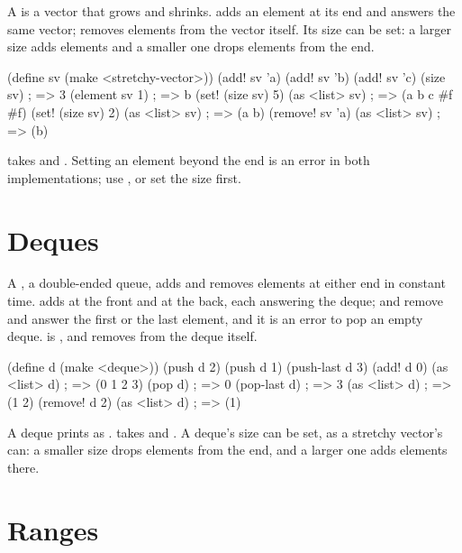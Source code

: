 A  is a vector that grows and shrinks.
 adds an element at its end and answers the same vector;
 removes elements from the vector itself. Its size can be
set: a larger size adds  elements and a smaller one drops
elements from the end.

\begin{dylan}
(define sv (make <stretchy-vector>))
(add! sv 'a)
(add! sv 'b)
(add! sv 'c)
(size sv)           ; => 3
(element sv 1)      ; => b
(set! (size sv) 5)
(as <list> sv)      ; => (a b c #f #f)
(set! (size sv) 2)
(as <list> sv)      ; => (a b)
(remove! sv 'a)
(as <list> sv)      ; => (b)
\end{dylan}

\noindent {} takes  and . Setting an
element beyond the end is an error in both implementations; use
, or set the size first.

\section{Deques}\label{sec:collections-deques}

A , a double-ended queue, adds and removes elements at
either end in constant time.  adds at the front and
 at the back, each answering the deque;  and
 remove and answer the first or the last element, and it
is an error to pop an empty deque.  is , and
 removes from the deque itself.

\begin{dylan}
(define d (make <deque>))
(push d 2)
(push d 1)
(push-last d 3)
(add! d 0)
(as <list> d)       ; => (0 1 2 3)
(pop d)             ; => 0
(pop-last d)        ; => 3
(as <list> d)       ; => (1 2)
(remove! d 2)
(as <list> d)       ; => (1)
\end{dylan}

\noindent A deque prints as .
 takes  and . A deque's size can be
set, as a stretchy vector's can: a smaller size drops elements from the
end, and a larger one adds  elements there.

\section{Ranges}\label{sec:collections-ranges}

